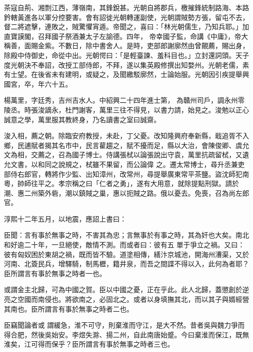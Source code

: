 \begin{pinyinscope}
 茶寇自荊、湘剽江西，薄嶺南，其鋒銳甚。光朝自將郡兵，檄摧鋒統制路海、本路鈐轄黃進各以軍分控要害。會有詔徙光朝轉運副使，光朝謂賊勢方張，留屯不去，督二將遮擊，連敗之，賊驚懼宵遁。帝聞之，喜曰：「林光朝儒生，乃知兵耶。」加直寶謨閣，召拜國子祭酒兼太子左諭德。四年，
 帝幸國子監，命講《中庸》，帝大稱善，面賜金紫。不數日，除中書舍人。是時，吏部郎謝廓然由曾覿薦，賜出身，除殿中侍御史，命從中出。光朝愕曰：「是輕臺諫、羞科目也。」立封還詞頭。天子度光朝決不奉詔，改授工部侍郎，不拜，遂以集英殿修撰出知婺州。光朝老儒，素有士望。在後省未有建明，或疑之，及聞繳駁廓然，士論始服。光朝因引疾提舉興國宮，卒，年六十五。



 楊萬里，字廷秀，吉州吉水人。中紹興二十四年進士第，
 為贛州司戶，調永州零陵丞。時張浚謫永，杜門謝客，萬里三往不得見，以書力請，始見之。浚勉以正心誠意之學，萬里服其教終身，乃名讀書之室曰誠齋。



 浚入相，薦之朝。除臨安府教授，未赴，丁父憂。改知隆興府奉新縣，戢追胥不入鄉，民逋賦者揭其名市中，民言雚趨之，賦不擾而足，縣以大治，會陳俊卿、虞允文為相，交薦之，召為國子博士。侍講張栻以論張說出守袁，萬里抗疏留栻，又遺允文書，以和同之說規之，栻雖不果留，而公論偉
 之。遷太常博士，尋升丞兼吏部侍右郎官，轉將作少監、出知漳州，改常州，尋提舉廣東常平茶鹽。盜沈師犯南粵，帥師往平之。孝宗稱之曰「仁者之勇」，遂有大用意，就除提點刑獄。請於潮、惠二州築外砦，潮以鎮賊之巢，惠以扼賊之路。俄以憂去。免喪，召為尚左郎官。



 淳熙十二年五月，以地震，應詔上書曰：



 臣聞：言有事於無事之時，不害其為忠；言無事於有事之時，其為奸也大矣。南北和好逾二十年，一旦絕使，敵情不測。而或者曰：彼有五
 單于爭立之禍。又曰：彼有匈奴困於東胡之禍，既而皆不驗。道塗相傳，繕汴京城池，開海州漕渠，又於河南、北簽民兵，增驛騎，制馬櫪，籍井泉，而吾之間諜不得以入，此何為者耶？臣所謂言有事於無事之時者一也。



 或謂金主北歸，可為中國之賀。臣以中國之憂，正在乎此。此人北歸，蓋懲創於逆亮之空國而南侵也。將欲南之，必固北之。或者以身填撫其北，而以其子與婿經營其南也。臣所謂言有事於無事之時者二也。



 臣竊聞論者或
 謂緩急，淮不可守，則棄淮而守江，是大不然。昔者吳與魏力爭而得合肥，然後吳始安。李煜失滁、揚二州，自此南唐始蹙。今曰棄淮而保江，既無淮矣，江可得而保乎？臣所謂言有事於無事之時者三也。




\end{pinyinscope}
